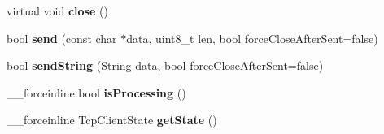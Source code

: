 \begin{DoxyCompactItemize}
\item 
\hypertarget{class_tcp_client_a1ee082bbca3927811bbe2c0aa75386c4}{}virtual void {\bfseries close} ()\label{class_tcp_client_a1ee082bbca3927811bbe2c0aa75386c4}

\item 
\hypertarget{class_tcp_client_a38bf30a25fe74a70ef874bb2524a6da3}{}bool {\bfseries send} (const char $\ast$data, uint8\+\_\+t len, bool force\+Close\+After\+Sent=false)\label{class_tcp_client_a38bf30a25fe74a70ef874bb2524a6da3}

\item 
\hypertarget{class_tcp_client_a08a4c755e8dab2b3761a56ac8386e41b}{}bool {\bfseries send\+String} (String data, bool force\+Close\+After\+Sent=false)\label{class_tcp_client_a08a4c755e8dab2b3761a56ac8386e41b}

\item 
\hypertarget{class_tcp_client_af97510bea711663fbe4803829561c968}{}\+\_\+\+\_\+forceinline bool {\bfseries is\+Processing} ()\label{class_tcp_client_af97510bea711663fbe4803829561c968}

\item 
\hypertarget{class_tcp_client_a39adb717bf57c16fcd6496752bda510a}{}\+\_\+\+\_\+forceinline Tcp\+Client\+State {\bfseries get\+State} ()\label{class_tcp_client_a39adb717bf57c16fcd6496752bda510a}

\end{DoxyCompactItemize}
